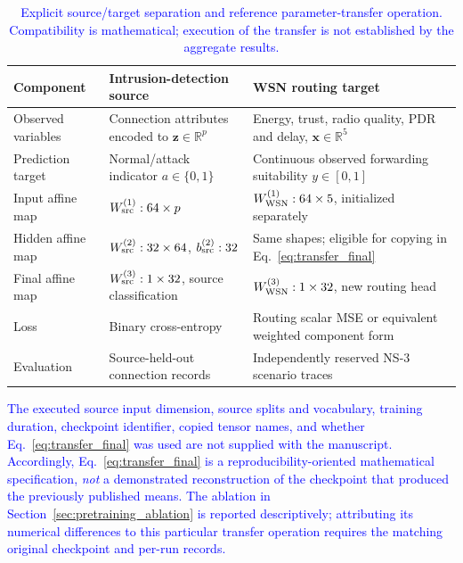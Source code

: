 \documentclass[pdflatex,sn-mathphys-num]{sn-jnl}
\newcommand{\Revised}[1]{\textcolor{blue}{#1}}
\begin{document}
\begin{table}[ht]
\centering\small
\caption{\Revised{Explicit source/target separation and reference parameter-transfer operation. Compatibility is mathematical; execution of the transfer is not established by the aggregate results.}}
\label{tab:domain_transfer_r2}
\begin{tabular}{p{}p{}p{}}
\toprule
\textbf{Component} & \textbf{Intrusion-detection source} & \textbf{WSN routing target}\\
\midrule
Observed variables & Connection attributes encoded to $\mathbf z\in\mathbb R^p$ & Energy, trust, radio quality, PDR and delay, $\mathbf x\in\mathbb R^5$\\
Prediction target & Normal/attack indicator $a\in\{0,1\}$ & Continuous observed forwarding suitability $y\in[0,1]$\\
Input affine map & $W_{\rm src}^{(1)}:64\times p$ & $W_{\rm WSN}^{(1)}:64\times5$, initialized separately\\
Hidden affine map & $W_{\rm src}^{(2)}:32\times64$, $b_{\rm src}^{(2)}:32$ & Same shapes; eligible for copying in Eq.~\eqref{eq:transfer_final}\\
Final affine map & $W_{\rm src}^{(3)}:1\times32$, source classification & $W_{\rm WSN}^{(3)}:1\times32$, new routing head\\
Loss & Binary cross-entropy & Routing scalar MSE or equivalent weighted component form\\
Evaluation & Source-held-out connection records & Independently reserved NS-3 scenario traces\\
\bottomrule
\end{tabular}
\end{table}

\Revised{The executed source input dimension, source splits and vocabulary, training duration, checkpoint identifier, copied tensor names, and whether Eq.~\eqref{eq:transfer_final} was used are not supplied with the manuscript. Accordingly, Eq.~\eqref{eq:transfer_final} is a reproducibility-oriented mathematical specification, \emph{not} a demonstrated reconstruction of the checkpoint that produced the previously published means. The ablation in Section~\ref{sec:pretraining_ablation} is reported descriptively; attributing its numerical differences to this particular transfer operation requires the matching original checkpoint and per-run records.}
\end{document}
